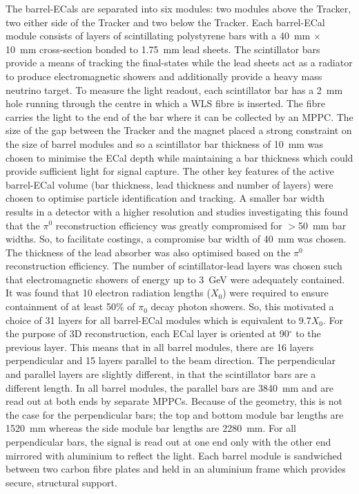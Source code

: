 The barrel-ECals are separated into six modules: two modules above the Tracker, two either side of the Tracker and two below the Tracker.  Each barrel-ECal module consists of layers of scintillating polystyrene bars with a 40~mm $\times$ 10~mm cross-section bonded to 1.75~mm lead sheets.  The scintillator bars provide a means of tracking the final-states while the lead sheets act as a radiator to produce electromagnetic showers and additionally provide a heavy mass neutrino target.  To measure the light readout, each scintillator bar has a 2~mm hole running through the centre in which a WLS fibre is inserted.  The fibre carries the light to the end of the bar where it can be collected by an MPPC.  The size of the gap between the Tracker and the magnet placed a strong constraint on the size of barrel modules and so a scintillator bar thickness of 10~mm was chosen to minimise the ECal depth while maintaining a bar thickness which could provide sufficient light for signal capture.  The other key features of the active barrel-ECal volume (bar thickness, lead thickness and number of layers) were chosen to optimise particle identification and tracking.  A smaller bar width results in a detector with a higher resolution and studies investigating this found that the $\pi^0$ reconstruction efficiency was greatly compromised for $>$50~mm bar widths.  So, to facilitate costings, a compromise bar width of 40~mm was chosen.  The thickness of the lead absorber was also optimised based on the $\pi^0$ reconstruction efficiency.  The number of scintillator-lead layers was chosen such that electromagnetic showers of energy up to 3~GeV were adequately contained.  It was found that 10 electron radiation lengths ($X_0$) were required to ensure containment of at least 50$\%$ of $\pi_0$ decay photon showers.  So, this motivated a choice of 31 layers for all barrel-ECal modules which is equivalent to 9.7$X_0$.  For the purpose of 3D reconstruction, each ECal layer is oriented at 90$^\circ$ to the previous layer.  This means that in all barrel modules, there are 16 layers perpendicular and 15 layers parallel to the beam direction.  The perpendicular and parallel layers are slightly different, in that the scintillator bars are a different length.  In all barrel modules, the parallel bars are 3840~mm and are read out at both ends by separate MPPCs.  Because of the geometry, this is not the case for the perpendicular bars; the top and bottom module bar lengths are 1520~mm whereas the side module bar lengths are 2280~mm.  For all perpendicular bars, the signal is read out at one end only with the other end mirrored with aluminium to reflect the light.  Each barrel module is sandwiched between two carbon fibre plates and held in an aluminium frame which provides secure, structural support.
